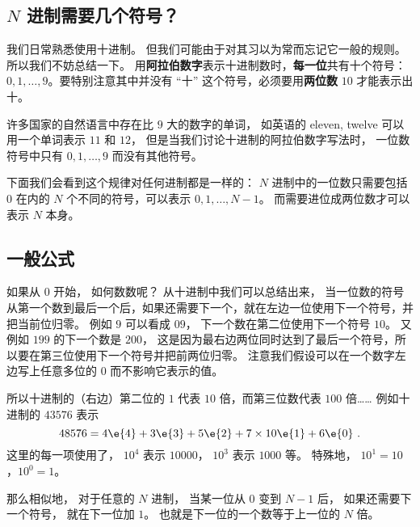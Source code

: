 
\begin{issues}
\issueTODO
\end{issues}

\subsection{$N$ 进制需要几个符号？}
我们日常熟悉使用十进制。 但我们可能由于对其习以为常而忘记它一般的规则。 所以我们不妨总结一下。 用\textbf{阿拉伯数字}表示十进制数时，\textbf{每一位}共有十个符号： $0,1,\dots, 9$。要特别注意其中并没有 “十” 这个符号，必须要用\textbf{两位数} $10$ 才能表示出十。

许多国家的自然语言中存在比 $9$ 大的数字的单词， 如英语的 eleven, twelve 可以用一个单词表示 $11$ 和 $12$， 但是当我们讨论十进制的阿拉伯数字写法时， 一位数符号中只有 $0,1,\dots, 9$ 而没有其他符号。 

下面我们会看到这个规律对任何进制都是一样的： $N$ 进制中的一位数只需要包括 $0$ 在内的 $N$ 个不同的符号，可以表示 $0,1,\dots,N-1$。 而需要进位成两位数才可以表示 $N$ 本身。

\subsection{一般公式}

如果从 $0$ 开始， 如何数数呢？ 从十进制中我们可以总结出来， 当一位数的符号从第一个数到最后一个后，如果还需要下一个，就在左边一位使用下一个符号，并把当前位归零。 例如 $9$ 可以看成 $09$， 下一个数在第二位使用下一个符号 $10$。 又例如 $199$ 的下一个数是 $200$， 这是因为最右边两位同时达到了最后一个符号，所以要在第三位使用下一个符号并把前两位归零。 注意我们假设可以在一个数字左边写上任意多位的 $0$ 而不影响它表示的值。

所以十进制的（右边）第二位的 $1$ 代表 $10$ 倍，而第三位数代表 $100$ 倍…… 例如十进制的 $43576$ 表示
\begin{equation}\label{eq_Binary_1}
48576 = 4\e{4} + 3\e{3} + 5\e{2} + 7\times 10\e{1} + 6\e{0}~.
\end{equation}
这里的每一项使用了， $10^4$ 表示 $10000$， $10^3$ 表示 $1000$ 等。 特殊地， $10^1=10$，$10^0=1$。

那么相似地， 对于任意的 $N$ 进制， 当某一位从 $0$ 变到 $N-1$ 后， 如果还需要下一个符号， 就在下一位加 $1$。 也就是下一位的一个数等于上一位的 $N$ 倍。

